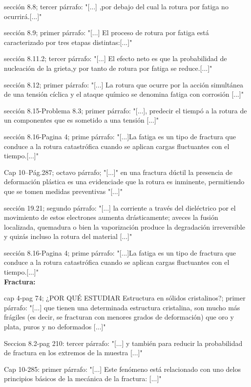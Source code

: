 \documentclass[12pt,a4paper]{article}
\begin{document}
sección 8.8; tercer párrafo: "[...] ,por debajo del cual la rotura por fatiga no ocurrirá.[...]"

sección 8.9; primer párrafo: "[...] El proceso de rotura por fatiga está caracterizado por tres etapas distintas:[...]" 

sección 8.11.2; tercer párrafo: "[...] El efecto neto es que la probabilidad de nucleación de la grieta,y por tanto de rotura por fatiga se reduce.[...]"

 sección 8.12; primer párrafo: "[...] La rotura que ocurre por la acción simultánea de una tensión cíclica y el ataque químico se denomina fatiga con corrosión [...]"
 
sección 8.15-Problema 8.3; primer párrafo: "[...], predecir el tiempó a la rotura de un componentes que es sometido a una tensión [...]"

sección 8.16-Pagina 4; prime párrafo: "[...]La fatiga es un tipo de fractura que conduce a la rotura catastrófica cuando se aplican cargas fluctuantes con el tiempo.[...]"

Cap 10–Pág.287; octavo párrafo; "[...]" en una fractura dúctil la presencia de deformación plástica es una evidenciade que la rotura es inminente, permitiendo que se tomen medidas preventivas "[...]" 

sección 19.21; segundo párrafo: "[...] la corriente a través del dieléctrico por el movimiento de estos electrones aumenta drásticamente; aveces la fusión localizada,  quemadura o bien la vaporización produce la degradación irreversible y quizás incluso la rotura del material [...]"
    
sección 8.16-Pagina 4; prime párrafo: "[...]La fatiga es un tipo de fractura que conduce a la rotura catastrófica cuando se aplican cargas fluctuantes con el tiempo.[...]"\\[0.1cm]
    
\textbf{Fractura:}

cap 4-pag 74; ¿POR QUÉ ESTUDIAR Estructura en sólidos cristalinos?; primer párrafo: "[...] que tienen
una determinada estructura cristalina, son mucho más frágiles (es decir, se fracturan con menores grados de deformación) que oro y plata, puros y no deformados [...]"

Seccion 8.2-pag 210: tercer párrafo: "[...] y también para reducir la probabilidad de fractura en los extremos de la muestra [...]"

Cap 10-285: primer párrafo: "[...] Este fenómeno está relacionado con uno delos principios básicos de la mecánica de la fractura: [...]"
\end{document}
